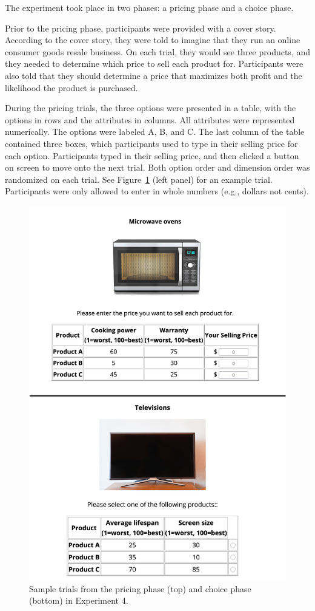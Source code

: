 The experiment took place in two phases: a pricing phase and a choice phase.

Prior to the pricing phase, participants were provided with a cover story. According to the cover story, they were told to imagine that they run an online consumer goods resale business. On each trial, they would see three products, and they needed to determine which price to sell each product for. Participants were also told that they should determine a price that maximizes both profit and the likelihood the product is purchased. 

During the pricing trials, the three options were presented in a table, with the options in rows and the attributes in columns. All attributes were represented numerically. The options were labeled A, B, and C. The last column of the table contained three boxes, which participants used to type in their selling price for each option. Participants typed in their selling price, and then clicked a button on screen to move onto the next trial. Both option order and dimension order was randomized on each trial. See Figure~\ref{fig:ce_rating_choice_trial} (left panel) for an example trial. Participants were only allowed to enter in whole numbers (e.g., dollars not cents).

\begin{figure}
    \includegraphics{figures/ce_rating_choice_example_trial.jpg}
    \caption{Sample trials from the pricing phase (top) and choice phase (bottom) in Experiment 4.}
    \label{fig:ce_rating_choice_trial}
\end{figure}

